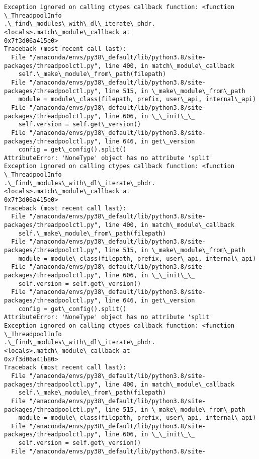 \documentclass[11pt]{article}
\begin{document}
\begin{Verbatim}[commandchars=\\\{\}]
Exception ignored on calling ctypes callback function: <function \_ThreadpoolInfo
.\_find\_modules\_with\_dl\_iterate\_phdr.<locals>.match\_module\_callback at
0x7f3d06a415e0>
Traceback (most recent call last):
  File "/anaconda/envs/py38\_default/lib/python3.8/site-
packages/threadpoolctl.py", line 400, in match\_module\_callback
    self.\_make\_module\_from\_path(filepath)
  File "/anaconda/envs/py38\_default/lib/python3.8/site-
packages/threadpoolctl.py", line 515, in \_make\_module\_from\_path
    module = module\_class(filepath, prefix, user\_api, internal\_api)
  File "/anaconda/envs/py38\_default/lib/python3.8/site-
packages/threadpoolctl.py", line 606, in \_\_init\_\_
    self.version = self.get\_version()
  File "/anaconda/envs/py38\_default/lib/python3.8/site-
packages/threadpoolctl.py", line 646, in get\_version
    config = get\_config().split()
AttributeError: 'NoneType' object has no attribute 'split'
Exception ignored on calling ctypes callback function: <function \_ThreadpoolInfo
.\_find\_modules\_with\_dl\_iterate\_phdr.<locals>.match\_module\_callback at
0x7f3d06a415e0>
Traceback (most recent call last):
  File "/anaconda/envs/py38\_default/lib/python3.8/site-
packages/threadpoolctl.py", line 400, in match\_module\_callback
    self.\_make\_module\_from\_path(filepath)
  File "/anaconda/envs/py38\_default/lib/python3.8/site-
packages/threadpoolctl.py", line 515, in \_make\_module\_from\_path
    module = module\_class(filepath, prefix, user\_api, internal\_api)
  File "/anaconda/envs/py38\_default/lib/python3.8/site-
packages/threadpoolctl.py", line 606, in \_\_init\_\_
    self.version = self.get\_version()
  File "/anaconda/envs/py38\_default/lib/python3.8/site-
packages/threadpoolctl.py", line 646, in get\_version
    config = get\_config().split()
AttributeError: 'NoneType' object has no attribute 'split'
Exception ignored on calling ctypes callback function: <function \_ThreadpoolInfo
.\_find\_modules\_with\_dl\_iterate\_phdr.<locals>.match\_module\_callback at
0x7f3d06a41b80>
Traceback (most recent call last):
  File "/anaconda/envs/py38\_default/lib/python3.8/site-
packages/threadpoolctl.py", line 400, in match\_module\_callback
    self.\_make\_module\_from\_path(filepath)
  File "/anaconda/envs/py38\_default/lib/python3.8/site-
packages/threadpoolctl.py", line 515, in \_make\_module\_from\_path
    module = module\_class(filepath, prefix, user\_api, internal\_api)
  File "/anaconda/envs/py38\_default/lib/python3.8/site-
packages/threadpoolctl.py", line 606, in \_\_init\_\_
    self.version = self.get\_version()
  File "/anaconda/envs/py38\_default/lib/python3.8/site-

\end{Verbatim}
\end{document}
